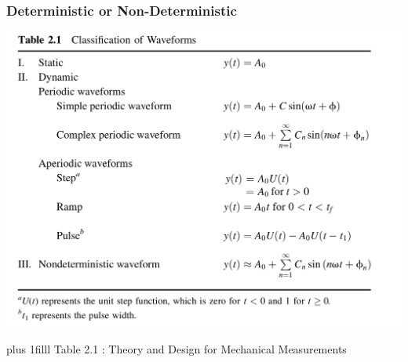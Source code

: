 \documentclass[fleqn]{beamer} %
\newcommand{\sectiontitleIV}{Deterministic or Non-Deterministic}
\newcommand{\btVFill}{\vskip0pt plus 1filll}
\begin{document}
\begin{frame}[label=sectionIV] \small
\frametitle{\sectiontitleIV}
\bigskip

\includegraphics[scale=.15]{table_2_1.png}

\btVFill
\tiny{Table 2.1 : Theory and Design for Mechanical Measurements}	
\end{frame}
\end{document}
